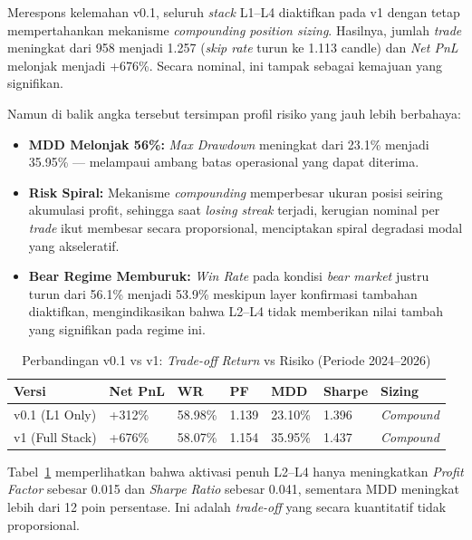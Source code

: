 Merespons kelemahan v0.1, seluruh \textit{stack} L1--L4 diaktifkan pada v1 dengan tetap mempertahankan mekanisme \textit{compounding position sizing}. Hasilnya, jumlah \textit{trade} meningkat dari 958 menjadi 1.257 (\textit{skip rate} turun ke 1.113 candle) dan \textit{Net PnL} melonjak menjadi +676\%. Secara nominal, ini tampak sebagai kemajuan yang signifikan.

Namun di balik angka tersebut tersimpan profil risiko yang jauh lebih berbahaya:
\begin{itemize}
    \item \textbf{MDD Melonjak 56\%:} \textit{Max Drawdown} meningkat dari 23.1\% menjadi 35.95\% --- melampaui ambang batas operasional yang dapat diterima.
    \item \textbf{Risk Spiral:} Mekanisme \textit{compounding} memperbesar ukuran posisi seiring akumulasi profit, sehingga saat \textit{losing streak} terjadi, kerugian nominal per \textit{trade} ikut membesar secara proporsional, menciptakan spiral degradasi modal yang akseleratif.
    \item \textbf{Bear Regime Memburuk:} \textit{Win Rate} pada kondisi \textit{bear market} justru turun dari 56.1\% menjadi 53.9\% meskipun layer konfirmasi tambahan diaktifkan, mengindikasikan bahwa L2--L4 tidak memberikan nilai tambah yang signifikan pada regime ini.
\end{itemize}

\begin{table}[h!]
\centering
\caption{Perbandingan v0.1 vs v1: \textit{Trade-off} \textit{Return} vs Risiko (Periode 2024--2026)}
\label{table:v0_vs_v1}
\begin{tabular}{@{}lllllll@{}}
\toprule
\textbf{Versi} & \textbf{Net PnL} & \textbf{WR} & \textbf{PF} & \textbf{MDD} & \textbf{Sharpe} & \textbf{Sizing} \\ \midrule
v0.1 (L1 Only)  & +312\%  & 58.98\% & 1.139 & 23.10\%  & 1.396 & \textit{Compound} \\
v1 (Full Stack) & +676\%  & 58.07\% & 1.154 & 35.95\%  & 1.437 & \textit{Compound} \\
\bottomrule
\end{tabular}
\end{table}

Tabel~\ref{table:v0_vs_v1} memperlihatkan bahwa aktivasi penuh L2--L4 hanya meningkatkan \textit{Profit Factor} sebesar 0.015 dan \textit{Sharpe Ratio} sebesar 0.041, sementara MDD meningkat lebih dari 12 poin persentase. Ini adalah \textit{trade-off} yang secara kuantitatif tidak proporsional.

